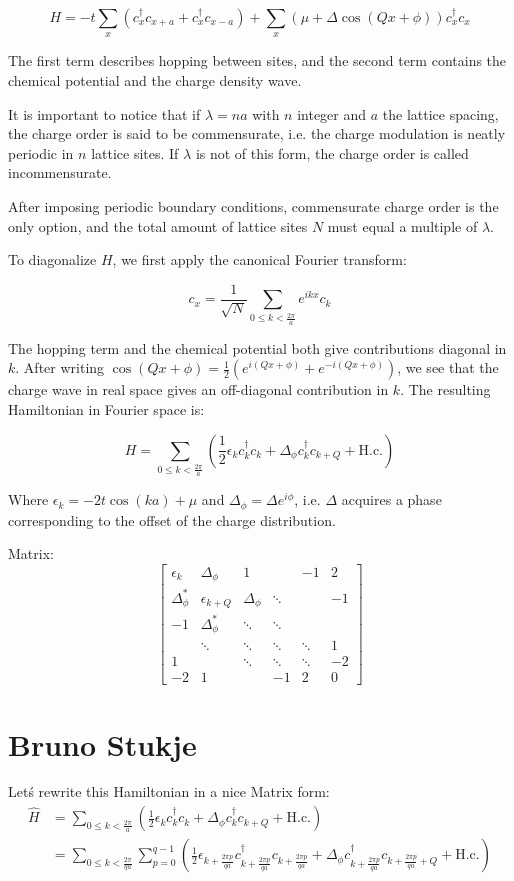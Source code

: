 \documentclass[letterpaper, 10 pt, conference]{ieeeconf}  %
\begin{document}
$$ H = -t \sum_x (c_x^{\dagger}c_{x+a} + c_x^{\dagger}c_{x-a}) + \sum_x (\mu + \Delta \cos(Qx + \phi))c_x^{\dagger}c_x $$

The first term describes hopping between sites, and the second term contains the chemical potential and the charge density wave.

It is important to notice that if $\lambda = n a$ with $n$ integer and $a$ the lattice spacing, the charge order is said to be commensurate, i.e. the charge modulation is neatly periodic in $n$ lattice sites. If $\lambda$ is not of this form, the charge order is called incommensurate.

After imposing periodic boundary conditions, commensurate charge order is the only option, and the total amount of lattice sites $N$ must equal a multiple of $\lambda$.

To diagonalize $H$, we first apply the canonical Fourier transform:

$$c_x = \frac{1}{\sqrt{N}}\sum_{0 \leq k < \frac{2\pi}{a}}e^{ikx}c_k$$

The hopping term and the chemical potential both give contributions diagonal in $k$. After writing $\cos(Qx + \phi) = \frac{1}{2}(e^{i(Qx + \phi)} + e^{-i(Qx + \phi)}) $, we see that the charge wave in real space gives an off-diagonal contribution in $k$. The resulting Hamiltonian in Fourier space is:

$$ H = \sum_{0 \leq k < \frac{2\pi}{a}} (\frac{1}{2}\epsilon_k c_k^{\dagger}c_k + \Delta_\phi c_k^{\dagger}c_{k+Q} + \text{H.c.}) $$

Where $\epsilon_k = -2t \cos(ka) + \mu $ and $\Delta_\phi = \Delta e^{i\phi}$, i.e. $\Delta$ acquires a phase corresponding to the offset of the charge distribution.

Matrix:
$$
\begin{bmatrix}
\epsilon_k       & \Delta_\phi     & 1      &        & -1     & 2  \\
\Delta_\phi^*    & \epsilon_{k+Q} & \Delta_\phi & \ddots &        & -1 \\
-1               & \Delta_\phi^* & \ddots & \ddots &    \\
   & \ddots & \ddots & \ddots & \ddots & 1  \\
1  &        & \ddots & \ddots & \ddots & -2 \\
-2 & 1      &        & -1     & 2      & 0
\end{bmatrix}
$$

\section{Bruno Stukje}
Let\'s rewrite this Hamiltonian in a nice Matrix form:
\begin{align*}
\hat{H} &= \sum_{0 \leq k < \frac{2\pi}{a}} (\frac{1}{2}\epsilon_k c_k^{\dagger}c_k + \Delta_\phi c_k^{\dagger}c_{k+Q} + \text{H.c.})\\
&=\sum_{0 \leq k < \frac{2\pi}{qa}} \sum_{p=0}^{q-1}  (\frac{1}{2}\epsilon_{k+\frac{2\pi p}{qa}} c_{k+\frac{2\pi p}{qa}}^{\dagger}c_{k+\frac{2\pi p}{qa}} + \Delta_\phi c_{k+\frac{2\pi p}{qa}}^{\dagger}c_{k+\frac{2\pi p}{qa}+Q} + \text{H.c.})\\
\end{align*}
\end{document}
